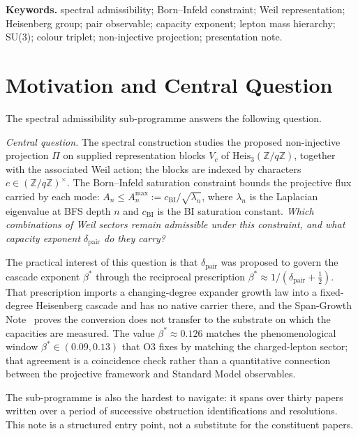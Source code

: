 \documentclass[11pt,a4paper]{article}
\theoremstyle{definition}
\newcommand{\Heis}{\mathrm{Heis}}
\newcommand{\dimpair}{\delta_{\mathrm{pair}}}
\newcommand{\betastar}{\beta^*}
\newcommand{\cchi}{c_{\mathrm{BI}}}
\begin{document}
  \medskip
  \noindent\textbf{Keywords.}
  spectral admissibility; Born--Infeld constraint; Weil representation; Heisenberg group;
  pair observable; capacity exponent; lepton mass hierarchy; SU(3); colour triplet;
  non-injective projection; presentation note.

  \newpage
  \tableofcontents

  \newpage

  \section{Motivation and Central Question}
    \label{sec:motivation}

    The spectral admissibility sub-programme answers the following question.

    \medskip
    \noindent\textit{Central question.} The spectral construction studies the proposed
    non-injective projection $\Pi$ on supplied representation blocks $V_c$ of
    $\Heis_3(\mathbb{Z}/q\mathbb{Z})$, together with the associated Weil action; the blocks are
    indexed by characters $c \in (\mathbb{Z}/q\mathbb{Z})^\times$.
    The Born--Infeld saturation constraint bounds the projective flux carried by each mode:
    $A_n \leq A^{\max}_n := \cchi/\sqrt{\lambda_n}$, where $\lambda_n$ is the Laplacian
    eigenvalue at BFS depth $n$ and $\cchi$ is the BI saturation constant.
    \textit{Which combinations of Weil sectors remain admissible under this constraint, and
    what capacity exponent $\dimpair$ do they carry?}

    \medskip
    The practical interest of this question is that $\dimpair$ was proposed to govern the cascade
    exponent $\betastar$ through the reciprocal prescription
    $\betastar \approx 1/(\dimpair + \tfrac{1}{2})$.
    That prescription imports a changing-degree expander growth law into a fixed-degree Heisenberg
    cascade and has no native carrier there, and the Span-Growth Note~\cite{Beau2026sgn} proves the
    conversion does not transfer to the substrate on which the capacities are measured.
    The value $\betastar \approx 0.126$ matches the phenomenological window
    $\betastar \in (0.09, 0.13)$ that O3 fixes by matching the charged-lepton sector;
    that agreement is a coincidence check rather than a quantitative connection between the
    projective framework and Standard Model observables.

    \medskip
    The sub-programme is also the hardest to navigate: it spans over thirty papers written
    over a period of successive obstruction identifications and resolutions.
    This note is a structured entry point, not a substitute for the constituent papers.
\end{document}
